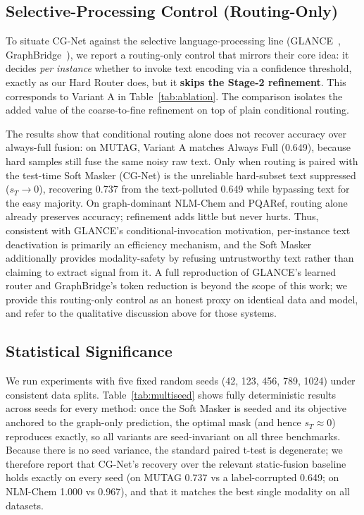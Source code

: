 \documentclass[preprint,12pt,authoryear]{elsarticle}
\begin{document}
\subsection{Selective-Processing Control (Routing-Only)}
\label{sec:selective_comp}
To situate CG-Net against the selective language-processing line (GLANCE~\citep{loveland2026glance}, GraphBridge~\citep{wang2024graphbridge}), we report a routing-only control that mirrors their core idea: it decides \emph{per instance} whether to invoke text encoding via a confidence threshold, exactly as our Hard Router does, but it \textbf{skips the Stage-2 refinement}. This corresponds to Variant A in Table~\ref{tab:ablation}. The comparison isolates the added value of the coarse-to-fine refinement on top of plain conditional routing.

The results show that conditional routing alone does not recover accuracy over always-full fusion: on MUTAG, Variant A matches Always Full (0.649), because hard samples still fuse the same noisy raw text. Only when routing is paired with the test-time Soft Masker (CG-Net) is the unreliable hard-subset text suppressed ($s_T\to0$), recovering 0.737 from the text-polluted 0.649 while bypassing text for the easy majority. On graph-dominant NLM-Chem and PQARef, routing alone already preserves accuracy; refinement adds little but never hurts. Thus, consistent with GLANCE's conditional-invocation motivation, per-instance text deactivation is primarily an efficiency mechanism, and the Soft Masker additionally provides modality-safety by refusing untrustworthy text rather than claiming to extract signal from it. A full reproduction of GLANCE's learned router and GraphBridge's token reduction is beyond the scope of this work; we provide this routing-only control as an honest proxy on identical data and model, and refer to the qualitative discussion above for those systems.
\subsection{Statistical Significance}
\label{sec:significance}
We run experiments with five fixed random seeds (42, 123, 456, 789, 1024) under consistent data splits. Table~\ref{tab:multiseed} shows fully deterministic results across seeds for every method: once the Soft Masker is seeded and its objective anchored to the graph-only prediction, the optimal mask (and hence $s_T\approx0$) reproduces exactly, so all variants are seed-invariant on all three benchmarks. Because there is no seed variance, the standard paired t-test is degenerate; we therefore report that CG-Net's recovery over the relevant static-fusion baseline holds exactly on every seed (on MUTAG 0.737 vs a label-corrupted 0.649; on NLM-Chem 1.000 vs 0.967), and that it matches the best single modality on all datasets.
\end{document}
